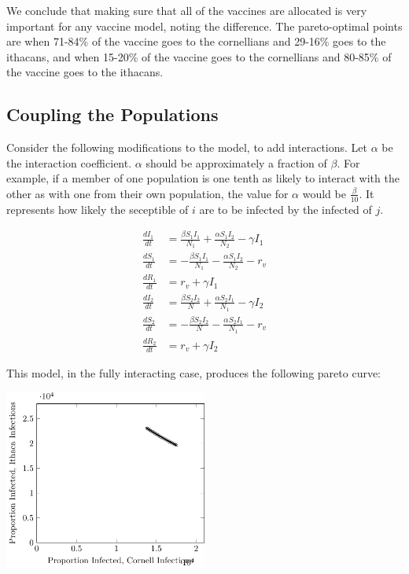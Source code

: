 \documentclass[titlepage]{article}
\begin{document}
We conclude that making sure that all of the vaccines are allocated is very
	important for any vaccine model, noting the difference.
The pareto-optimal points are when 71-84\% of the vaccine goes to the
	cornellians and 29-16\% goes to the ithacans,
	and when 15-20\% of the vaccine goes to the cornellians
	and 80-85\% of the vaccine goes to the ithacans.

\subsection{Coupling the Populations}

Consider the following modifications to the model, to add interactions.
Let $\alpha$ be the interaction coefficient.
$\alpha$ should be approximately a fraction of $\beta$.
For example, if a member of one population is one tenth as likely
	to interact with the other as with one from their own population,
	the value for $\alpha$ would be $\frac{\beta}{10}$.
It represents how likely the seceptible of $i$ are to be infected by the
	infected of $j$.

\begin{align*}
\frac{dI_1}{dt} & = \frac{ \beta S_1 I_1}{N_1} + \frac{ \alpha S_1 I_2 }{N_2} - \gamma I_1\\
\frac{dS_1}{dt} & = -\frac{\beta S_1 I_1}{N_1}  - \frac{ \alpha S_1 I_2 }{N_2} - r_v \\
\frac{dR_1}{dt} & = r_v + \gamma I_1 \\
\frac{dI_2}{dt} & = \frac{ \beta S_2 I_2}{N}  + \frac{ \alpha S_2 I_1 }{N_1} - \gamma I_2\\
\frac{dS_2}{dt} & = -\frac{\beta S_2 I_2}{N}  - \frac{ \alpha S_2 I_1 }{N_1} - r_v \\
\frac{dR_2}{dt} & = r_v + \gamma I_2
\end{align*}

This model, in the fully interacting case, produces the following pareto curve:

\includegraphics[width=0.5\textwidth]{figures/sir-interacting.pdf}
\end{document}
